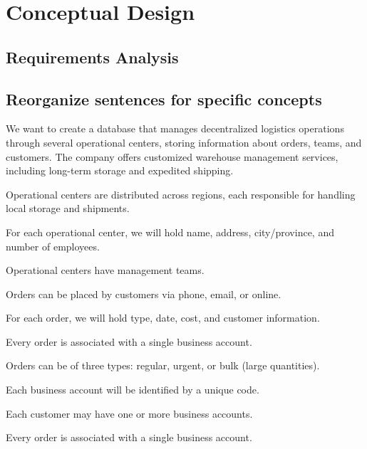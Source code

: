 \chapter{Conceptual Design}

\section{Requirements Analysis}



\section{Reorganize sentences for specific concepts}


\begin{tcolorbox}[title=General Phrases]
We want to create a database that manages decentralized logistics operations through several operational centers, storing information about orders, teams, and customers. The company offers customized warehouse management services, including long-term storage and expedited shipping.
\end{tcolorbox}

\begin{tcolorbox}[title=Phrases related to Operational Centers]
Operational centers are distributed across regions, each responsible for handling local storage and shipments.  

For each operational center, we will hold name, address, city/province, and number of employees.  

Operational centers have management teams.
\end{tcolorbox}

\begin{tcolorbox}[title=Phrases related to Orders]
Orders can be placed by customers via phone, email, or online.  

For each order, we will hold type, date, cost, and customer information.  

Every order is associated with a single business account.  

Orders can be of three types: regular, urgent, or bulk (large quantities).
\end{tcolorbox}

\begin{tcolorbox}[title=Phrases related to Business Accounts]
Each business account will be identified by a unique code.  

Each customer may have one or more business accounts.  

Every order is associated with a single business account.
\end{tcolorbox}

